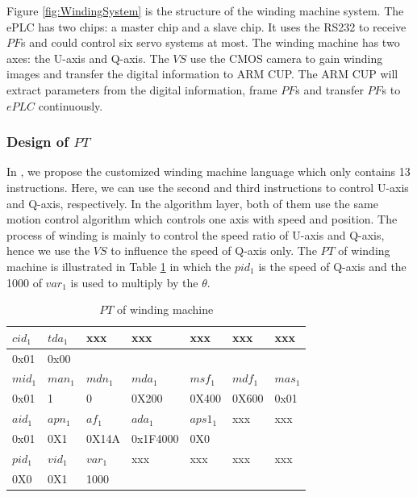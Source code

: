 \documentclass[journal,UTF8]{IEEEtran}
\begin{document}
Figure \ref{fig:WindingSystem} is the structure of the winding machine system. The ePLC has two chips: a master chip and a slave chip. It uses the RS232 to receive $PF$s and could control six servo systems at most. The winding machine has two axes: the U-axis and Q-axis. The $VS$ use the CMOS camera to gain winding images and transfer the digital information to ARM CUP. The ARM CUP will extract parameters from the digital information, frame $PF$s and transfer $PF$s to $ePLC$ continuously. 


\subsubsection{Design of $PT$}
In \cite{wu2018customized}, we propose the customized winding machine language which only contains 13 instructions. Here, we can use the second and third instructions to control U-axis and Q-axis, respectively. In the algorithm layer, both of them use the same motion control algorithm which controls one axis with speed and position. The process of winding is mainly to control the speed ratio of U-axis and Q-axis, hence we use the $VS$ to influence the speed of Q-axis only. The $PT$ of winding machine is illustrated in Table \ref{table:PTofWinding} in which the $pid_1$ is the speed of Q-axis and the 1000 of $var_1$ is used to multiply by the $\theta$.
\begin{table}
	\scriptsize \caption{$PT$ of winding machine}
	\label{table:PTofWinding}
	\begin{center}
		\renewcommand{\arraystretch}{1.4}
		\setlength\tabcolsep{3pt}
		\begin{tabular}{|p{1cm}|p{1cm}|p{1cm}|p{1cm}|p{1cm}|p{1cm}|p{1cm}|}
			\hline
			$cid_1$  & $tda_1$   &xxx &xxx& xxx  &xxx &xxx \\
			\hline
			0x01&0x00&& &&&\\
			\hline
			$mid_1$   & $man_1$ &$mdn_1$ &$mda_1$&$msf_1$& $mdf_1$  & $mas_1$\\
			\hline
			0x01      & 1     &   0    &0X200   &0X400   & 0X600  &0x01 \\
			\hline
			$aid_1$  & $apn_1$& $af_1$ &$ada_1$ &$aps1_1$  &xxx&xxx\\
			\hline
			0x01     & 0X1    & 0X14A  &0x1F4000 &0X0   & &\\
			\hline
			$pid_1$  &$vid_1$ &$var_1$ &xxx      &xxx   &xxx &xxx\\
            \hline
			0X0      & 0X1    & 1000   &         &   & &\\
	    	\hline
		\end{tabular}
	\end{center}
\end{table}
\end{document}

